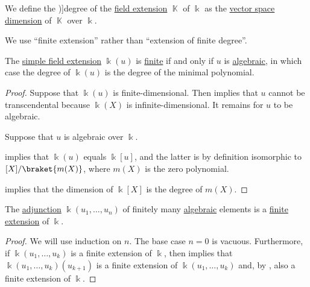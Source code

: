 \begin{definition}\label{def:field_extension_degree}
  We define the \term[ru=степень (def. \cite[9.5.1]{Винберг2014Алгебра})]{degree} of the \hyperref[def:field/submodel]{field extension} \( \BbbK \) of \( \Bbbk \) as the \hyperref[thm:vector_space_dimension]{vector space dimension} of \( \BbbK \) over \( \Bbbk \).

  We use \enquote{finite extension} rather than \enquote{extension of finite degree}.
\end{definition}

\begin{proposition}\label{thm:simple_extension_dimension}
  The \hyperref[def:simple_field_extension]{simple field extension} \( \Bbbk(u) \) is \hyperref[def:field_extension_degree]{finite} if and only if \( u \) is \hyperref[def:algebraic_element]{algebraic}, in which case the degree of \( \Bbbk(u) \) is the degree of the minimal polynomial.
\end{proposition}
\begin{proof}
  \SufficiencySubProof Suppose that \( \Bbbk(u) \) is finite-dimensional. Then  implies that \( u \) cannot be transcendental because \( \Bbbk(X) \) is infinite-dimensional. It remains for \( u \) to be algebraic.

  \NecessitySubProof Suppose that \( u \) is algebraic over \( \Bbbk \).

   implies that \( \Bbbk(u) \) equals \( \Bbbk[u] \), and the latter is by definition isomorphic to \( \Bbbk[X] / \braket{ m(X) } \), where \( m(X) \) is the zero polynomial.

   implies that the dimension of \( \Bbbk[X] \) is the degree of \( m(X) \).
\end{proof}

\begin{proposition}\label{thm:finite_adjunction_finite_extension}
  The \hyperref[def:field_adjunction]{adjunction} \( \Bbbk(u_1, \ldots, u_n) \) of finitely many \hyperref[def:algebraic_element]{algebraic} elements is a \hyperref[def:field_extension_degree]{finite extension} of \( \Bbbk \).
\end{proposition}
\begin{proof}
  We will use induction on \( n \). The base case \( n = 0 \) is vacuous. Furthermore, if \( \Bbbk(u_1, \ldots, u_k) \) is a finite extension of \( \Bbbk \), then  implies that \( \Bbbk(u_1, \ldots, u_k)(u_{k+1}) \) is a finite extension of \( \Bbbk(u_1, \ldots, u_k) \) and, by , also a finite extension of \( \Bbbk \).
\end{proof}

